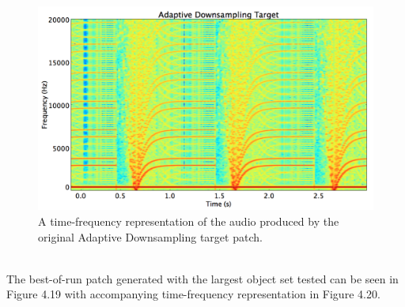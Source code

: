 \documentclass[a4paper,12pt]{report} 	%
\numberwithin{figure}{chapter}
\numberwithin{table}{chapter}
\numberwithin{equation}{chapter}
\begin{document}
\begin{flushleft}
\begin{figure}[h!]
\begin{center}
\includegraphics[scale=0.35,width=\linewidth]{AdaptiveDownsamplingTargetSTFT}
\caption[Original Adaptive Downsampling Time-Frequency Representation]{A time-frequency representation of the audio produced by the original Adaptive Downsampling target patch.}
\end{center}
\end{figure}
\\

The best-of-run patch generated with the largest object set tested can be seen in Figure 4.19 with accompanying time-frequency representation in Figure 4.20.


\end{flushleft}
\end{document}
